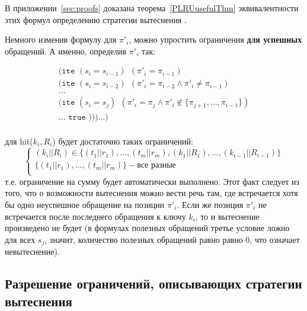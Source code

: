 В приложении~\ref{sec:proofs} доказана теорема~\ref{PLRUusefulThm} эквивалентности этих формул определению стратегии вытеснения \PseudoLRU.

Немного изменив формулу для $\pi'_i$, можно упростить ограничения \textbf{для успешных} обращений. А именно, определив $\pi'_i$ так:

$$
\begin{array}{l}
\texttt{(ite~} (s_i = s_{i-1}) ~~ (\pi'_i = \pi_{i-1})\\
\texttt{(ite~} (s_i = s_{i-2}) ~~ (\pi'_i = \pi_{i-2} \wedge \pi'_i \neq \pi_{i-1})\\
...\\
\texttt{(ite~} (s_i = s_j) ~~ (\pi'_i = \pi_j \wedge \pi'_i \notin \{\pi_{j+1}, ..., \pi_{i-1}\})\\
... \texttt{~true )))...)}\\
\end{array}
$$

для hit($k_i, R_i$) будет достаточно таких ограничений:
$$
\left\{\begin{array}{l}
(k_i||R_i) \in \{(t_1||r_1), ..., (t_m||r_m), (k_1||R_1), ..., (k_{i-1}||R_{i-1})\}\\
\{(t_1||r_1), ..., (t_m||r_m)\} - \mbox{все разные}\\
\end{array} \right.
$$
т.е. ограничение на сумму будет автоматически выполнено. Этот факт следует из того, что о возможности вытеснения можно вести речь там, где встречается хотя бы одно неуспешное обращение на позиции $\pi'_i$. Если же позиция $\pi'_i$ не встречается после последнего обращения к ключу $k_i$, то и вытеснение произведено не будет (в формулах полезных обращений третье условие ложно для всех $s_j$, значит, количество полезных обращений равно равно 0, что означает невытеснение).

\subsection{Разрешение ограничений, описывающих стратегии вытеснения}

